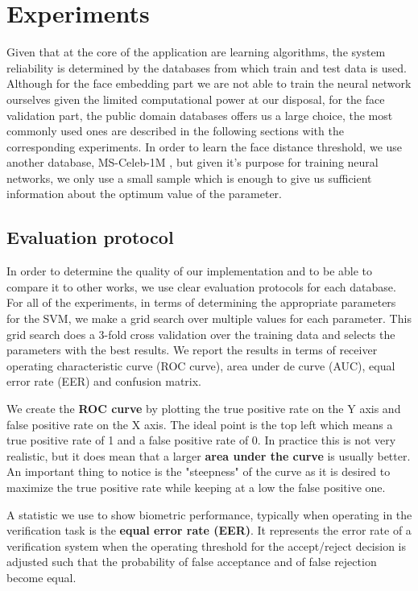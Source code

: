\afterpage{\blankpage}
\chapter{Experiments}
Given that at the core of the application are learning algorithms, the system reliability is determined by the databases from which train and test data is used. Although for the face embedding part we are not able to train the neural network ourselves given the limited computational power at our disposal, for the face validation part, the public domain databases offers us a large choice, the most commonly used ones are described in the following sections with the corresponding experiments. In order to learn the face distance threshold, we use another database, MS-Celeb-1M \cite{guo2016msceleb}, but given it's purpose for training neural networks, we only use a small sample which is enough to give us sufficient information about the optimum value of the parameter.


\section{Evaluation protocol}
In order to determine the quality of our implementation and to be able to compare it to other works, we use clear evaluation protocols for each database. For all of the experiments, in terms of determining the appropriate parameters for the SVM, we make a grid search over multiple values for each parameter. This grid search does a 3-fold cross validation over the training data and selects the parameters with the best results.
We report the results in terms of receiver operating characteristic curve (ROC curve), area under de curve (AUC), equal error rate (EER) and confusion matrix.

We create the \textbf{ROC curve} by plotting the true positive rate on the Y axis and false positive rate on the X axis. The ideal point is the top left which means a true positive rate of 1 and a false positive rate of 0. In practice this is not very realistic, but it does mean that a larger \textbf{area under the curve} is usually better. An important thing to notice is the "steepness" of the curve as it is desired to maximize the true positive rate while keeping at a low the false positive one.

A statistic we use to show biometric performance, typically when operating in the verification task is the \textbf{equal error rate (EER)}. It represents the error rate of a verification system when the operating threshold for the accept/reject decision is adjusted such that the probability of false acceptance and of false rejection become equal. 

